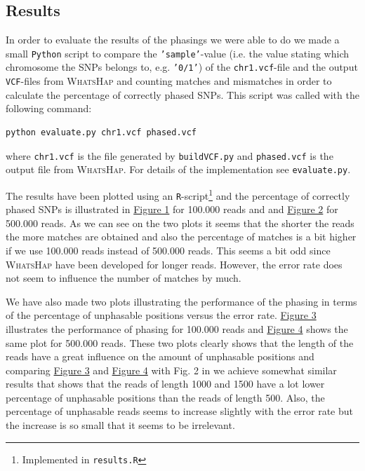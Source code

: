 \documentclass[10pt,a4paper]{article}
\begin{document}
\subsection{Results}
In order to evaluate the results of the phasings we were able to do we made a small \texttt{Python} script to compare the \texttt{'sample'}-value (i.e. the value stating which chromosome the SNPs belongs to, e.g. \texttt{'0/1'}) of the \texttt{chr1.vcf}-file and the output \texttt{VCF}-files from \textsc{WhatsHap} and counting matches and mismatches in order to calculate the percentage of correctly phased SNPs. This script was called with the following command:
\begin{lstlisting}
python evaluate.py chr1.vcf phased.vcf
\end{lstlisting}
where \texttt{chr1.vcf} is the file generated by \texttt{buildVCF.py} and \texttt{phased.vcf} is the output file from \textsc{WhatsHap}. For details of the implementation see \texttt{evaluate.py}.

The results have been plotted using an \texttt{R}-script\footnote{Implemented in \texttt{results.R}} and the percentage of correctly phased SNPs is illustrated in \hyperref[fig:100k]{Figure 1} for 100.000 reads and and \hyperref[fig:500k]{Figure 2} for 500.000 reads. As we can see on the two plots it seems that the shorter the reads the more matches are obtained and also the percentage of matches is a bit higher if we use 100.000 reads instead of 500.000 reads. This seems a bit odd since \textsc{WhatsHap} have been developed for longer reads. However, the error rate does not seem to influence the number of matches by much.

We have also made two plots illustrating the performance of the phasing in terms of the percentage of unphasable positions versus the error rate. \hyperref[fig:unphasable100k]{Figure 3} illustrates the performance of phasing for 100.000 reads and  \hyperref[fig:unphasable500k]{Figure 4} shows the same plot for 500.000 reads. These two plots clearly shows that the length of the reads have a great influence on the amount of unphasable positions and comparing \hyperref[fig:unphasable100k]{Figure 3} and \hyperref[fig:unphasable500k]{Figure 4} with Fig. 2 in \cite{whatshap} we achieve somewhat similar results that shows that the reads of length 1000 and 1500 have a lot lower percentage of unphasable positions than the reads of length 500. Also, the percentage of unphasable reads seems to increase slightly with the error rate but the increase is so small that it seems to be irrelevant.
\end{document}
